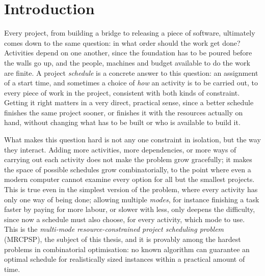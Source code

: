 
\chapter*{Introduction}
\label{chap:introduction}

Every project, from building a bridge to releasing a piece of software,
ultimately comes down to the same question: in what order should the work
get done?  Activities depend on one another, since
the foundation has to be poured before the walls go up, and the people,
machines and budget available to do the work are finite. A project
\emph{schedule} is a concrete answer to this question: an assignment of a
start time, and sometimes a choice of \emph{how} an activity is to be
carried out, to every piece of work in the project, consistent with both
kinds of constraint. Getting it right matters in a very direct, practical
sense, since a better schedule finishes the same project sooner, or finishes
it with the resources actually on hand, without changing what has to be
built or who is available to build it.

What makes this question hard is not any one constraint in isolation, but
the way they interact. Adding more activities, more dependencies, or more
ways of carrying out each activity does not make the problem grow
gracefully; it makes the space of possible schedules grow combinatorially,
to the point where even a modern computer cannot examine every option for
all but the smallest projects. This is true even in the simplest version of
the problem, where every activity has only one way of being done; allowing
multiple \emph{modes}, for instance finishing a task faster by paying for
more labour, or slower with less, only deepens the difficulty, since now a
schedule must also choose, for every activity, which mode to use. This is
the \emph{multi-mode resource-constrained project scheduling problem}
(MRCPSP), the subject of this thesis, and it is provably among the hardest
problems in combinatorial optimisation: no known algorithm can guarantee an
optimal schedule for realistically sized instances within a practical
amount of time.

